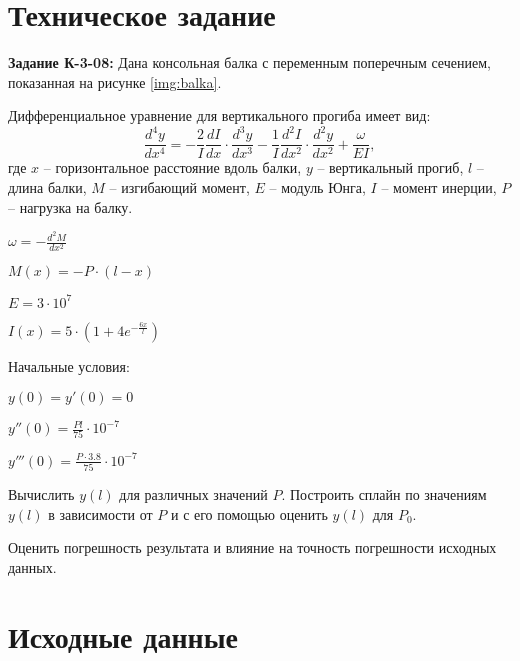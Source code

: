 





\section{Техническое задание}

\textbf{Задание К-3-08:} Дана консольная балка с переменным поперечным сечением, показанная на рисунке \ref{img:balka}.

Дифференциальное уравнение для вертикального прогиба имеет вид:
\[
\frac{d^4y}{dx^4} = - \frac{2}{I} \frac{dI}{dx}\cdot \frac{d^3y}{dx^3} -  \frac{1}{I} \frac{d^2I}{dx^2}\cdot \frac{d^2y}{dx^2} + \frac{\omega}{EI},
\]
где $x$ -- горизонтальное расстояние вдоль балки, $y$ -- вертикальный прогиб, $l$ -- длина балки, $M$ -- изгибающий момент, $E$ -- модуль Юнга, $I$ -- момент инерции, $P$ -- нагрузка на балку.

\begin{center}
\begin{multicols}{2}
$\omega = - \frac{d^2M}{dx^2}$

$M(x) = -P \cdot (l - x)$
\end{multicols}
\end{center}

\begin{center}
\begin{multicols}{2}
$E = 3\cdot 10^7$

$I(x) = 5 \cdot (1 + 4 e^{-\frac{6x}{l}})$
\end{multicols}
\end{center}

Начальные условия:
\begin{center}
\begin{multicols}{3}
$y(0) = y'(0) = 0$

$y''(0) = \frac{Pl}{75}\cdot 10^{-7}$

$y'''(0) = \frac{P \cdot 3.8}{75}\cdot 10^{-7}$
\end{multicols}
\end{center}

Вычислить $y(l)$ для различных значений $P$. Построить сплайн по значениям $y(l)$ в зависимости от $P$ и с его помощью оценить $y(l)$ для $P_0$. 

Оценить погрешность результата и влияние на точность погрешности исходных данных.

\section{Исходные данные}

